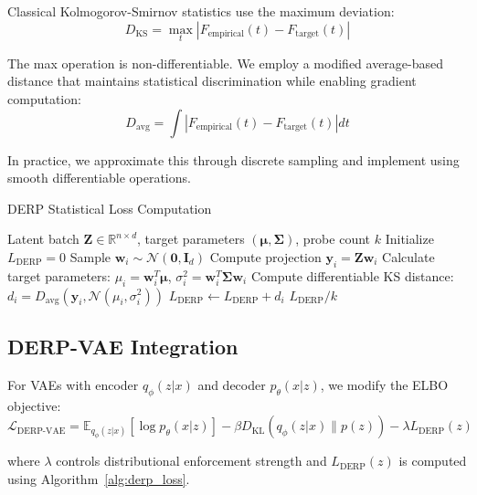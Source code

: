 \documentclass{article}
\begin{document}
Classical Kolmogorov-Smirnov statistics use the maximum deviation:
\begin{equation}
D_{\text{KS}} = \max_t |F_{\text{empirical}}(t) - F_{\text{target}}(t)|
\end{equation}

The max operation is non-differentiable. We employ a modified average-based distance that maintains statistical discrimination while enabling gradient computation:
\begin{equation}
D_{\text{avg}} = \int |F_{\text{empirical}}(t) - F_{\text{target}}(t)| dt
\end{equation}

In practice, we approximate this through discrete sampling and implement using smooth differentiable operations.

\begin{algorithm}[tb]
\caption{DERP Statistical Loss Computation}
\label{alg:derp_loss}
\begin{algorithmic}[1]
\REQUIRE Latent batch $\mathbf{Z} \in \mathbb{R}^{n \times d}$, target parameters $(\boldsymbol{\mu}, \boldsymbol{\Sigma})$, probe count $k$
\STATE Initialize $L_{\text{DERP}} = 0$
    \STATE Sample $\mathbf{w}_i \sim \mathcal{N}(\mathbf{0}, \mathbf{I}_d)$
    \STATE Compute projection $\mathbf{y}_i = \mathbf{Z} \mathbf{w}_i$
    \STATE Calculate target parameters: $\mu_i = \mathbf{w}_i^T \boldsymbol{\mu}$, $\sigma_i^2 = \mathbf{w}_i^T \boldsymbol{\Sigma} \mathbf{w}_i$
    \STATE Compute differentiable KS distance: $d_i = D_{\text{avg}}(\mathbf{y}_i, \mathcal{N}(\mu_i, \sigma_i^2))$
    \STATE $L_{\text{DERP}} \leftarrow L_{\text{DERP}} + d_i$
\ENDFOR
\RETURN $L_{\text{DERP}} / k$
\end{algorithmic}
\end{algorithm}

\subsection{DERP-VAE Integration}

For VAEs with encoder $q_{\phi}(z|x)$ and decoder $p_{\theta}(x|z)$, we modify the ELBO objective:
\begin{equation}
\mathcal{L}_{\text{DERP-VAE}} = \mathbb{E}_{q_{\phi}(z|x)}[\log p_{\theta}(x|z)] - \beta D_{\text{KL}}(q_{\phi}(z|x) \| p(z)) - \lambda L_{\text{DERP}}(z)
\end{equation}

where $\lambda$ controls distributional enforcement strength and $L_{\text{DERP}}(z)$ is computed using Algorithm~\ref{alg:derp_loss}.
\end{document}

